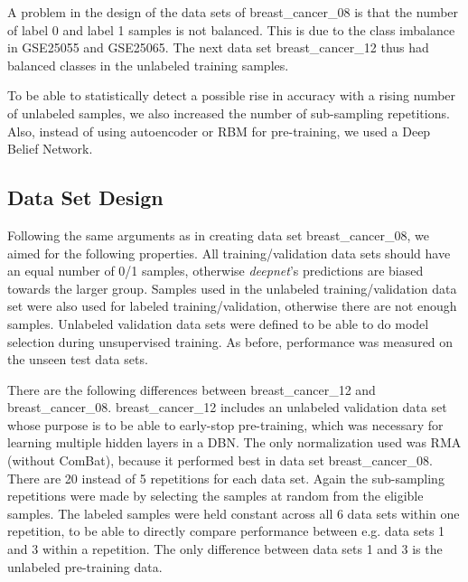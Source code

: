 A problem in the design of the data sets of breast\_cancer\_08 is
that the number of label 0 and label 1 samples is not balanced. This
is due to the class imbalance in GSE25055 and GSE25065. The next data
set breast\_cancer\_12
thus had balanced classes in the unlabeled training samples.

To be able to statistically detect a possible rise in accuracy with
a rising number of unlabeled samples, we also increased the number
of sub-sampling repetitions. Also, instead of using autoencoder or
RBM for pre-training, we used a Deep Belief Network.

\subsection{Data Set Design}

Following the same arguments as in creating data set breast\_cancer\_08,
we aimed for the following properties. All training/validation data
sets should have an equal number of 0/1 samples, otherwise \emph{deepnet}'s
predictions are biased towards the larger group. Samples used in the
unlabeled training/validation data set were also used for labeled
training/validation, otherwise there are not enough samples. Unlabeled
validation data sets were defined to be able to do model selection
during unsupervised training. As before, performance was measured
on the unseen test data sets.

There are the following differences between breast\_cancer\_12 and
breast\_cancer\_08. breast\_cancer\_12 includes an unlabeled validation
data set whose purpose is to be able to early-stop pre-training, which
was necessary for learning multiple hidden layers in a DBN. The only
normalization used was RMA (without ComBat), because it performed
best in data set breast\_cancer\_08. There are 20 instead of 5 repetitions
for each data set. Again the sub-sampling repetitions were made by
selecting the samples at random from the eligible samples. The labeled
samples were held constant across all 6 data sets within one repetition,
to be able to directly compare performance between e.g. data sets
1 and 3 within a repetition. The only difference between data sets
1 and 3 is the unlabeled pre-training data.

